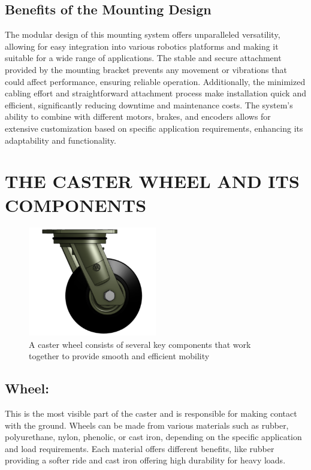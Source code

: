 \documentclass[../../main]{subfiles}
\begin{document}
\subsection{Benefits of the Mounting Design}
The modular design of this mounting system offers unparalleled versatility, allowing for easy integration into various robotics platforms and making it suitable for a wide range of applications. The stable and secure attachment provided by the mounting bracket prevents any movement or vibrations that could affect performance, ensuring reliable operation. Additionally, the minimized cabling effort and straightforward attachment process make installation quick and efficient, significantly reducing downtime and maintenance costs. The system's ability to combine with different motors, brakes, and encoders allows for extensive customization based on specific application requirements, enhancing its adaptability and functionality.

\section{THE CASTER WHEEL AND ITS COMPONENTS}

\begin{figure}[h!]
  \centering
  \includegraphics[width=0.5\textwidth]{img/caster.png}
  \caption{A caster wheel consists of several key components that work together to provide smooth and efficient mobility}

  \end{figure}

\subsection{Wheel:}
This is the most visible part of the caster and is responsible for making contact with the ground. Wheels can be made from various materials such as rubber, polyurethane, nylon, phenolic, or cast iron, depending on the specific application and load requirements. Each material offers different benefits, like rubber providing a softer ride and cast iron offering high durability for heavy loads.
\end{document}
